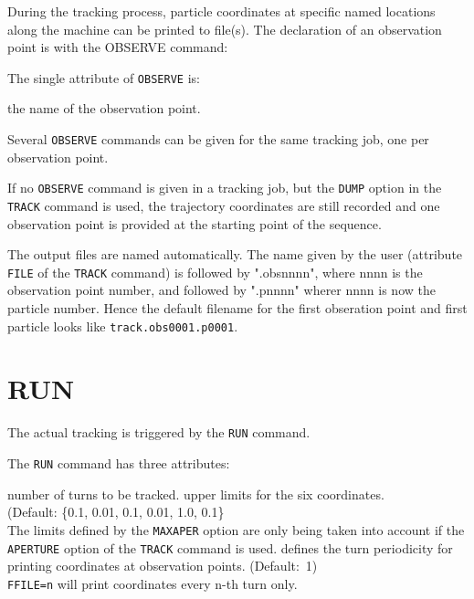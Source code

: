 During the tracking process, particle coordinates at specific named
locations along the machine can be printed to file(s). The declaration of
an observation point is with the OBSERVE command: 


The single attribute of \texttt{OBSERVE} is:
\begin{madlist}
   the name of the observation point. 
\end{madlist}
  
Several \texttt{OBSERVE} commands can be given for the same tracking
job, one per observation point. 

If no \texttt{OBSERVE} command is given in a tracking job, but the
\texttt{DUMP} option in the \texttt{TRACK} command is used, the
trajectory coordinates are still recorded and one observation point is
provided at the starting point of the sequence. 
     
The output files are named automatically. The name given by
the user (attribute \texttt{FILE} of the \texttt{TRACK} command) is
followed by ".obsnnnn", where nnnn is the observation point number, and followed by 
".pnnnn"  wherer nnnn is now the particle number. Hence the default
filename for the first obseration point and first particle looks like
\texttt{track.obs0001.p0001}.


\section{RUN}
\label{sec:run}

The actual tracking is triggered by the \texttt{RUN} command.


The \texttt{RUN} command has three attributes:

\begin{madlist}
   number of turns to be tracked.
   upper limits for the six coordinates.\\
  (Default: \{0.1, 0.01, 0.1, 0.01, 1.0, 0.1\} \\
  The limits defined by the \texttt{MAXAPER} option are only being taken
  into account if the \texttt{APERTURE} option of the \texttt{TRACK}
  command is used.
   defines the turn periodicity for printing coordinates at
   observation points. (Default:~1)\\
   \texttt{FFILE=n} will print coordinates every n-th turn only. 
\end{madlist}


